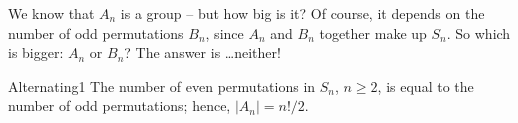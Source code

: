 % 
% 
% 
 
We know that $A_n$ is a group -- but how big is it? Of course, it depends on the number of odd permutations $B_n$, since $A_n$ and $B_n$ together make up $S_n$.
So which is bigger: $A_n$ or $B_n$? The answer is \ldots neither!

\begin{prop}{Alternating1}
The number of even permutations in $S_n$, $n \geq 2$, is equal to the
number of odd permutations; hence, $| A_n | = n!/2$.
\end{prop}
 
